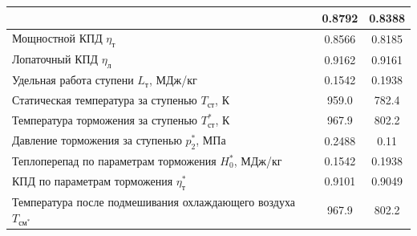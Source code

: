 \documentclass[a4paper,12pt]{article}
\begin{document}
\begin{longtable}{
    |p{8cm}|
%    
    c|
%    
    c|
%    
    }
%        
        & 0.8792
%        
        & 0.8388
%        
        \\ \hline
        Мощностной КПД $\eta_т$
%        
        & 0.8566
%        
        & 0.8185
%        
        \\ \hline
        Лопаточный КПД $\eta_л$
%        
        & 0.9162
%        
        & 0.9161
%        
        \\ \hline
        Удельная работа ступени $L_т$, МДж/кг
%        
        & 0.1542
%        
        & 0.1938
%        
        \\ \hline
        Статическая температура за ступенью $T_{ст}$, К
%        
        & 959.0
%        
        & 782.4
%        
        \\ \hline
        Температура торможения за ступенью $T_{ст}^*$, К
%        
        & 967.9
%        
        & 802.2
%        
        \\ \hline
        Давление торможения за ступенью $p_2^*$, МПа
%        
        & 0.2488
%        
        & 0.11
%        
        \\ \hline
        Теплоперепад по параметрам торможения $H_0^*$, МДж/кг
%        
        & 0.1542
%        
        & 0.1938
%        
        \\ \hline
        КПД по параметрам торможения $\eta_т^*$
%        
        & 0.9101
%        
        & 0.9049
%        
        \\ \hline
        Температура после подмешивания охлаждающего воздуха $T_{см^*}$
%        
        & 967.9
%        
        & 802.2
%        
        \\ \hline
    \end{longtable}
    
\end{document}
